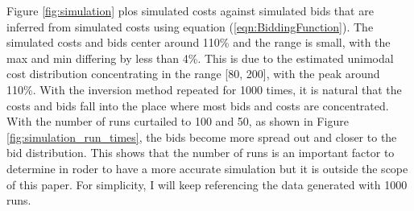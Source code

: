 \documentclass[11pt]{article}
\begin{document}
Figure \ref{fig:simulation} plos simulated costs against simulated bids that are 
inferred from simulated costs using equation (\ref{eqn:BiddingFunction}). 
The simulated costs and bids center around 110\% 
and the range is small, with the max and min differing by less than 4\%. This 
is due to the estimated unimodal cost distribution 
concentrating in the range [80, 200], with the peak around 110\%. 
With the inversion method repeated for 1000 times, it is natural that 
the costs and bids fall into the place where most bids and costs are 
concentrated. With the number of runs curtailed to 100 and 50, as shown in 
Figure \ref{fig:simulation_run_times}, the bids become more spread out and 
closer to the bid distribution. This shows that the number of runs is 
an important factor to determine in roder to have a more accurate simulation 
but it is outside the scope of this paper. For simplicity, I will keep 
referencing the data generated with 1000 runs. 
\end{document}
